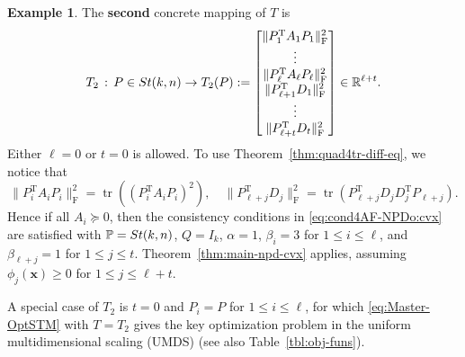 \documentclass[11pt]{article}
\def\bx{\pmb{x}}
\def\bbP{\mathbb{P}}
\def\bbR{\mathbb{R}}
\newcommand\STM[2]{{\rm St}(#1,#2)}
\DeclareMathOperator{\tr}{tr}
\DeclareMathOperator{\F}{F}
\DeclareMathOperator{\T}{T}
\theoremstyle{definition}
\newtheorem{example}{Example}[section]
\numberwithin{equation}{section}
\begin{document}
\begin{example}\label{eg:T2}
The {\bf second} concrete mapping of $T$ is
\begin{equation}\label{eq:T-F}
T_2\,:\, P\in\STM{k}{n} \to T_2(P):=\begin{bmatrix}
                                        \|P_1^{\T}A_1P_1\|_{\F}^2 \\
                                        \vdots \\
                                        \|P_{\ell}^{\T}A_{\ell}P_{\ell}\|_{\F}^2 \\
                                        \|P_{\ell+1}^{\T}D_1\|_{\F}^2 \\
                                        \vdots \\
                                        \|P_{\ell+t}^{\T}D_t\|_{\F}^2 \\
                                      \end{bmatrix} \in\bbR^{\ell+t}.
\end{equation}
Either $\ell=0$ or $t=0$ is allowed. To use Theorem~\ref{thm:quad4tr-diff-eq}, we notice that
$$
\|P_i^{\T}A_iP_i\|_{\F}^2=\tr((P_i^{\T}A_iP_i)^2),\quad
\|P_{\ell+j}^{\T}D_j\|_{\F}^2=\tr(P_{\ell+j}^{\T}D_jD_j^{\T}P_{\ell+j}).
$$
Hence if all $A_i\succeq 0$, then
the consistency conditions in \eqref{eq:cond4AF-NPDo:cvx} are satisfied with $\bbP=\STM{k}{n}$, $Q=I_k$,
$\alpha=1$, $\beta_i=3$ for $1\le i\le\ell$, and $\beta_{\ell+j}=1$ for $1\le j\le t$.
Theorem~\ref{thm:main-npd-cvx} applies, assuming $\phi_j(\bx)\ge 0$ for $1\le j\le\ell+t$.


A special case of $T_2$ is $t=0$ and $P_i=P$ for $1\le i\le\ell$, for which \eqref{eq:Master-OptSTM} with $T=T_2$
gives the key optimization problem in the uniform multidimensional scaling (UMDS)  \cite{zhzl:2017}
(see also Table~\ref{tbl:obj-funs}).
\end{example}
\end{document}
